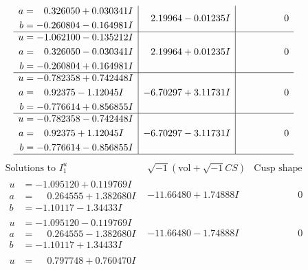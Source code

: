 \documentclass[1p]{elsarticle_modified}
\theoremstyle{definition}
\newcommand{\I}{\sqrt{-1}}
\begin{document}
$$\begin{array}{c|c|c}
\begin{aligned}
a &= \phantom{-}0.326050 + 0.030341 I \\
b &= -0.260804 - 0.164981 I\end{aligned}
 & \phantom{-}2.19964 - 0.01235 I & \phantom{-0.000000 } 0 \\ \hline\begin{aligned}
u &= -1.062100 - 0.135212 I \\
a &= \phantom{-}0.326050 - 0.030341 I \\
b &= -0.260804 + 0.164981 I\end{aligned}
 & \phantom{-}2.19964 + 0.01235 I & \phantom{-0.000000 } 0 \\ \hline\begin{aligned}
u &= -0.782358 + 0.742448 I \\
a &= \phantom{-}0.92375 - 1.12045 I \\
b &= -0.776614 + 0.856855 I\end{aligned}
 & -6.70297 + 3.11731 I & \phantom{-0.000000 } 0 \\ \hline\begin{aligned}
u &= -0.782358 - 0.742448 I \\
a &= \phantom{-}0.92375 + 1.12045 I \\
b &= -0.776614 - 0.856855 I\end{aligned}
 & -6.70297 - 3.11731 I & \phantom{-0.000000 } 0\\
 \hline 
 \end{array}$$\newpage$$\begin{array}{c|c|c}  
\text{Solutions to }I^u_{1}& \I (\text{vol} + \sqrt{-1}CS) & \text{Cusp shape}\\
 \hline 
\begin{aligned}
u &= -1.095120 + 0.119769 I \\
a &= \phantom{-}0.264555 + 1.382680 I \\
b &= -1.10117 - 1.34433 I\end{aligned}
 & -11.66480 + 1.74888 I & \phantom{-0.000000 } 0 \\ \hline\begin{aligned}
u &= -1.095120 - 0.119769 I \\
a &= \phantom{-}0.264555 - 1.382680 I \\
b &= -1.10117 + 1.34433 I\end{aligned}
 & -11.66480 - 1.74888 I & \phantom{-0.000000 } 0 \\ \hline\begin{aligned}
u &= \phantom{-}0.797748 + 0.760470 I \\

\end{aligned}
\end{array}$$
\end{document}
